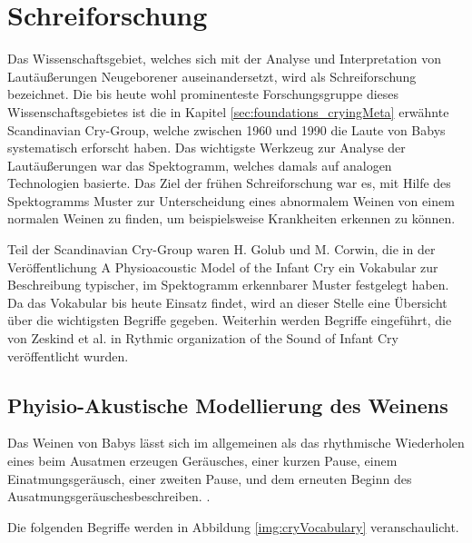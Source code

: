 \section{Schreiforschung}
\label{sec:cryresearch_foundations}

Das Wissenschaftsgebiet, welches sich mit der Analyse und Interpretation von Lautäußerungen Neugeborener auseinandersetzt, wird als \glqq Schreiforschung\grqq{} bezeichnet. Die bis heute wohl prominenteste Forschungsgruppe dieses Wissenschaftsgebietes ist die in Kapitel \ref{sec:foundations_cryingMeta} erwähnte \glqq Scandinavian Cry-Group\grqq \cite{crygroup}, welche zwischen 1960 und 1990 die Laute von Babys systematisch erforscht haben. Das wichtigste Werkzeug zur Analyse der Lautäußerungen war das Spektogramm, welches damals auf analogen Technologien basierte. Das Ziel der frühen Schreiforschung war es, mit Hilfe des Spektogramms Muster zur Unterscheidung eines abnormalem Weinen von einem normalen Weinen zu finden, um beispielsweise Krankheiten erkennen zu können.\cite[S. 142]{signal} 

Teil der Scandinavian Cry-Group waren H. Golub und M. Corwin, die in der Veröffentlichung \glqq A Physioacoustic Model of the Infant Cry\grqq \cite{cryModel} ein Vokabular zur Beschreibung typischer, im Spektogramm erkennbarer Muster festgelegt haben. Da das Vokabular bis heute Einsatz findet, wird an dieser Stelle eine Übersicht über die wichtigsten Begriffe gegeben. Weiterhin werden Begriffe eingeführt, die von Zeskind et al. in \glqq Rythmic organization of the Sound of Infant Cry \grqq{} veröffentlicht wurden.\cite{rythmic}

\subsection{Phyisio-Akustische Modellierung des Weinens}
\label{sec:acousticModel}

Das Weinen von Babys lässt sich im allgemeinen als das \glqq rhythmische Wiederholen eines beim Ausatmen erzeugen Geräusches, einer kurzen Pause, einem Einatmungsgeräusch, einer zweiten Pause, und dem erneuten Beginn des Ausatmungsgeräusches\grqq beschreiben. \cite{wolff}.

Die folgenden Begriffe werden in Abbildung \ref{img:cryVocabulary} veranschaulicht.

